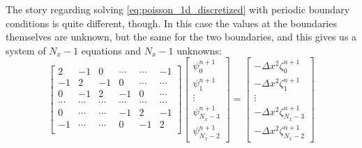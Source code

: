 \documentclass[12pt]{article}
\numberwithin{figure}{section}
\numberwithin{table}{section}
\begin{document}
\noindent The story regarding solving \eqref{eq:poisson_1d_discretized} with periodic boundary conditions is quite different, though. In this case the values at the boundaries themselves are unknown, but the same for the two boundaries, and this gives us a system of $N_x-1$ equations and $N_x-1$ unknowns:
\begin{equation}
	\begin{bmatrix}
                           2& -1& 0 &\cdots   & \cdots &-1 \\
                           -1 & 2 & -1 &0 &\cdots &\cdots \\
                           0&-1 &2 & -1 & 0 & \cdots \\
                           \cdots & \cdots   & \cdots &\cdots   &\cdots & \cdots \\
                           0& \cdots   & \cdots  &-1 &2& -1 \\
                           -1&\cdots    & \cdots  & 0  &-1 & 2 \\
                      \end{bmatrix}
	\begin{bmatrix}
		\psi_0^{n+1} \\
        \psi_1^{n+1} \\
        \vdots \\
        \psi_{N_x-3}^{n+1} \\
        \psi_{N_x-2}^{n+1}
	\end{bmatrix} =
    \begin{bmatrix}
		-\Delta x^2\zeta_0^{n+1} \\
        -\Delta x^2\zeta_1^{n+1} \\
        \vdots \\
        -\Delta x^2\zeta_{N_x-3}^{n+1} \\
        -\Delta x^2\zeta_{N_x-2}^{n+1}
	\end{bmatrix} \label{eq:linalg_periodic}
\end{equation}
\end{document}
